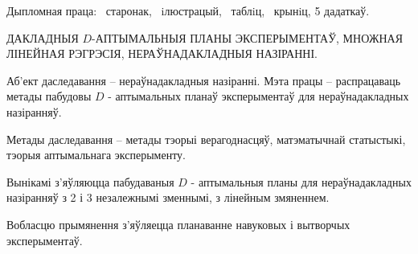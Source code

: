 Дыпломная праца: \ старонак, \totalfigures{}~iлюстрацый, \totaltables{}~таблiц,
\ крынiц, 5 дадаткаў.


\vspace{\baselineskip}

ДАКЛАДНЫЯ $D$-АПТЫМАЛЬНЫЯ ПЛАНЫ ЭКСПЕРЫМЕНТАЎ, МНОЖНАЯ ЛІНЕЙНАЯ РЭГРЭСІЯ, НЕРАЎНАДАКЛАДНЫЯ НАЗІРАННІ.

\vspace{\baselineskip}

Аб'ект даследавання -- нераўнадакладныя назіранні. Мэта працы -- распрацаваць метады пабудовы $D$ - аптымальных планаў эксперыментаў для нераўнадакладных назіранняў.

Метады даследавання -- метады тэорыі верагоднасцяў, матэматычнай
статыстыкі, тэорыя аптымальнага эксперыменту.

Вынікамі з'яўляюцца пабудаваныя $D$ - аптымальныя планы для нераўнадакладных назіранняў з 2 і 3 незалежнымі зменнымі, з лінейным змяненнем.

Вобласцю прымянення з'яўляецца планаванне навуковых і вытворчых эксперыментаў.

